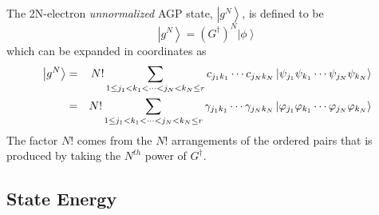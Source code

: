 \documentclass{article}
\begin{document}
The 2N-electron \emph{unnormalized }AGP state, $\left| g^{N}\right\rangle $,
is defined to be 
\begin{equation}
\left| g^{N}\right\rangle =\left( G^{\dagger }\right) ^{N}\left| \phi
\right\rangle
\end{equation}%
which can be expanded in coordinates as 
\begin{eqnarray}
\left| g^{N}\right\rangle &=&N!\sum_{1\leq j_{1}<k_{1}<\cdots
<j_{N}<k_{N}\leq r}c_{j_{1}k_{1}}\cdots c_{j_{N}k_{N}}\left| \psi
_{j_{1}}\psi _{k_{1}}\cdots \psi _{j_{N}}\psi _{k_{N}}\right\rangle  \notag
\\
&=&N!\sum_{1\leq j_{1}<k_{1}<\cdots <j_{N}<k_{N}\leq r}\gamma
_{j_{1}k_{1}}\cdots \gamma _{j_{N}k_{N}}\left| \varphi _{j_{1}}\varphi
_{k_{1}}\cdots \varphi _{j_{N}}\varphi _{k_{N}}\right\rangle  \label{AGPEX}
\end{eqnarray}%
The factor $N!$ comes from the $N!$ arrangements of the ordered pairs that
is produced by taking the $N^{th}$ power of $G^{\dagger }$.

\subsection{State Energy}
\end{document}
